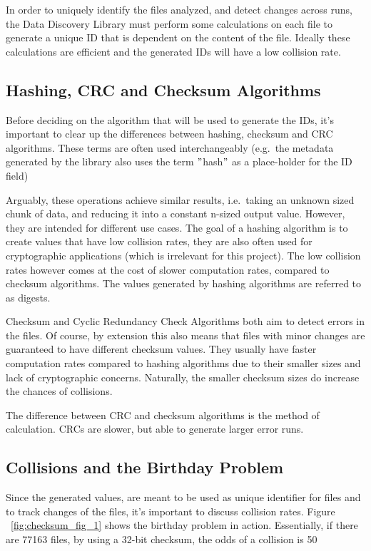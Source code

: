 In order to uniquely identify the files analyzed, and detect changes across runs, the Data Discovery Library must
perform some calculations on each file to generate a unique ID that is dependent on the content of the file.
Ideally these calculations are efficient and the generated IDs will have a low collision rate.

\subsection{Hashing, CRC and Checksum Algorithms}
Before deciding on the algorithm that will be used to generate the IDs, it's important to clear up the differences
between hashing, checksum and CRC algorithms.
These terms are often used interchangeably (e.g.\ the metadata generated by the library also uses the term \("\)hash\("\)
as a place-holder for the ID field)

Arguably, these operations achieve similar results, i.e.\ taking an unknown sized chunk of data, and reducing it into
a constant n-sized output value.
However, they are intended for different use cases.
The goal of a hashing algorithm is to create values that have low
collision rates, they are also often used for cryptographic applications (which is irrelevant for this project).
The low collision rates however comes at the cost of slower computation rates, compared to checksum algorithms.
The values generated by hashing algorithms are referred to as digests.

\newline

Checksum and Cyclic Redundancy Check Algorithms both aim to detect errors in the files.
Of course, by extension this
also means that files with minor changes are guaranteed to have different checksum values.
They usually have
faster computation rates compared to hashing algorithms due to their smaller sizes and lack of cryptographic concerns.
Naturally, the smaller checksum sizes do increase the chances of collisions.

The difference between CRC and checksum algorithms is the method of calculation.
CRCs are slower, but able to generate larger error runs.

\subsection{Collisions and the Birthday Problem}

Since the generated values, are meant to be used as unique identifier for files and to track changes of the files, it's important
to discuss collision rates. Figure ~\ref{fig:checksum_fig_1} shows the birthday problem in action.
Essentially, if there are 77163 files, by using a 32-bit checksum, the odds of a collision is 50%

